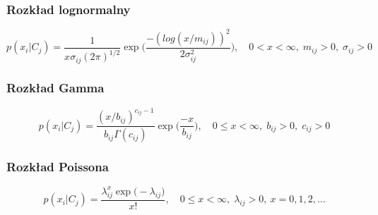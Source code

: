 \subsubsection{Rozkład lognormalny}
\label{subsec_lognorm}

	\begin{equation}
	\label{eq_lognorm}
	p(x_i | C_j) = \frac{1}{x \sigma_{ij} (2 \pi)^{1/2}} \exp\bigg( \frac{-(log(x/m_{ij}))^2}{2 \sigma_{ij}^2} \bigg), \quad
	0 < x < \infty, \; m_{ij} > 0, \; \sigma_{ij}  > 0
	\end{equation}


\subsubsection{Rozkład Gamma}
\label{subsec_gamma}

	\begin{equation}
	\label{eq_gamma}
	p(x_i | C_j) = \frac{(x/b_{ij})^{c_{ij}-1}}{b_{ij} \Gamma(c_{ij})} \exp \bigg( \frac{-x}{b_{ij}} \bigg), \quad
	0 \leq x < \infty, \; b_{ij} > 0, \; c_{ij}  > 0
	\end{equation}
	
\subsubsection{Rozkład Poissona}
\label{subsec_gamma}

	\begin{equation}
	\label{eq_poisson}
	p(x_i | C_j) = \frac{\lambda_{ij}^x \exp \big( -\lambda_{ij} \big)}{x!}, \quad
	0 \leq x < \infty, \; \lambda_{ij} > 0, \: x=0,1,2, \dots
	\end{equation}
